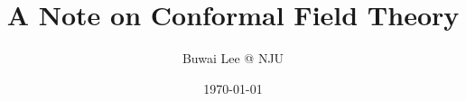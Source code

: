 \documentclass[12pt]{book}
\title{A Note on Conformal Field Theory}
\author{Buwai Lee @ NJU}
\date{\today}
\theoremstyle{definition}
\theoremstyle{plain}
\begin{document}
\begin{titlepage}
	\maketitle
\end{titlepage}

\frontmatter
\tableofcontents
\mainmatter
	
\backmatter
\end{document}
